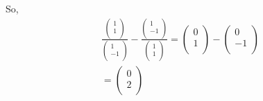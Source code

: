 \documentclass[journal,12pt,twocolumn]{IEEEtran}
\begin{document}
So,\\

\begin{align}
\frac{\begin{pmatrix}
      1 \\ 
      1 \\
      \end{pmatrix}}{\begin{pmatrix}
      1 \\ 
      -1 \\
      \end{pmatrix}} - \frac{\begin{pmatrix}
      1 \\ 
      -1 \\
      \end{pmatrix}}{\begin{pmatrix}
      1 \\ 
      1 \\
      \end{pmatrix}} = \begin{pmatrix}
      0\\ 
      1\\
      \end{pmatrix} - \begin{pmatrix}
      0\\ 
      -1\\
      \end{pmatrix} \\
      = \begin{pmatrix}
      0\\ 
      2\\
      \end{pmatrix}
\end{align}
\end{document}
